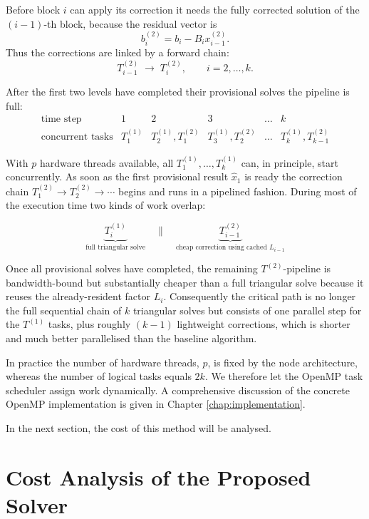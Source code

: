 Before block $i$ can apply its correction it needs the fully corrected
solution of the $(i-1)$-th block, because the residual vector is
$$
  b^{(2)}_{i}=b_{i}-B_{i}x^{(2)}_{i-1}.
$$
Thus the corrections are linked by a forward chain:
$$
  T^{(2)}_{i-1}
    \;\longrightarrow\;
  T^{(2)}_{i},
  \qquad
  i=2,\dots,k .
$$

After the first two levels have completed their provisional solves the
pipeline is full:
$$
  \begin{array}{c|c|c|c|c|c}
    \text{time step} & 1 & 2 & 3 & \dots & k\\\hline
    \text{concurrent tasks} &
      T^{(1)}_{1} & T^{(1)}_{2},T^{(2)}_{1} &
      T^{(1)}_{3},T^{(2)}_{2} & \dots &
      T^{(1)}_{k},T^{(2)}_{k-1}
  \end{array}
$$

With $p$ hardware threads available,
all $T^{(1)}_{1},\dots,T^{(1)}_{k}$ can, in principle, start
concurrently.
As soon as the first provisional result $\hat x_{1}$ is ready the
correction chain $T^{(2)}_{1}\!\to T^{(2)}_{2}\!\to\cdots$ begins and runs in a pipelined fashion.
During most of the execution time two kinds of work overlap:

$$
\underbrace{T^{(1)}_{i}}_{\text{full triangular solve}}
\quad\parallel\quad
\underbrace{T^{(2)}_{i-1}}_{\text{cheap correction using cached }L_{i-1}}
$$

Once all provisional solves have completed, the remaining
$T^{(2)}$-pipeline is bandwidth-bound but substantially cheaper than a
full triangular solve because it reuses the already-resident
factor $L_{i}$.
Consequently the critical path is no longer the full sequential chain of
$k$ triangular solves but consists of one parallel step for the $T^{(1)}$ tasks, plus roughly $(k-1)$ lightweight corrections, which is shorter and much better parallelised than the baseline algorithm.

In practice the number of hardware threads, $p$, is fixed by the node architecture, whereas the number of logical tasks equals $2k$.  We therefore let the OpenMP task scheduler assign work
dynamically. A comprehensive discussion of the concrete OpenMP implementation is given
in Chapter \ref{chap:implementation}.

In the next section, the cost of this method will be analysed.

\section{Cost Analysis of the Proposed Solver}
\label{chap:meth_cost_analysis}

